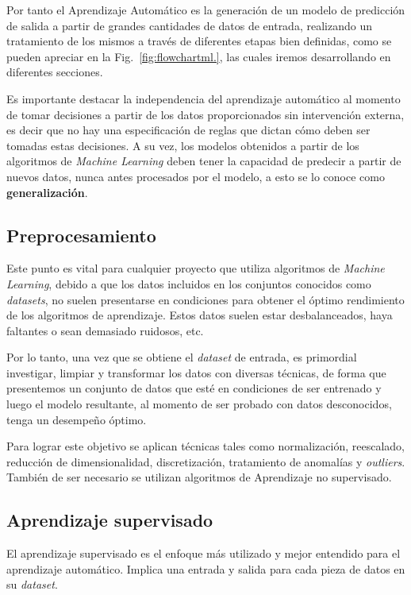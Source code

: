 \documentclass[a4paper,12pt]{article}
\begin{document}
Por tanto el Aprendizaje Automático es la generación de un modelo de predicción de salida a partir de grandes cantidades de datos de entrada, realizando un tratamiento de los mismos a través de diferentes etapas bien definidas, como se pueden apreciar en la Fig.~\ref{fig:flowchartml.}, las cuales iremos desarrollando en diferentes secciones.

Es importante destacar la independencia del aprendizaje automático al momento de tomar decisiones a partir de los datos proporcionados sin intervención externa, es decir que no hay una especificación de reglas que dictan cómo deben ser tomadas estas decisiones. A su vez, los modelos obtenidos a partir de los algoritmos de \textit{Machine Learning} deben tener la capacidad de predecir a partir de nuevos datos, nunca antes procesados por el modelo, a esto se lo conoce como \textbf{generalización}. 

\subsection{Preprocesamiento} \label{preprocessing}
Este punto es vital para cualquier proyecto que utiliza algoritmos de \textit{Machine Learning}, debido a que los datos incluidos en los conjuntos conocidos como \textit{datasets}, no suelen presentarse en condiciones para obtener el óptimo rendimiento de los algoritmos de aprendizaje. Estos datos suelen estar desbalanceados, haya faltantes o sean demasiado ruidosos, etc. 

Por lo tanto, una vez que se obtiene el \textit{dataset} de entrada, es primordial investigar, limpiar y transformar los datos con diversas técnicas, de forma que presentemos un conjunto de datos que esté en condiciones de ser entrenado y luego el modelo resultante, al momento de ser probado con datos desconocidos, tenga un desempeño óptimo.  

Para lograr este objetivo se aplican técnicas tales como normalización, reescalado, reducción de dimensionalidad, discretización, tratamiento de anomalías y \textit{outliers}. También de ser necesario se utilizan algoritmos de Aprendizaje no supervisado.

\subsection{Aprendizaje supervisado} \label{supervised}
El aprendizaje supervisado es el enfoque más utilizado y mejor entendido para el aprendizaje automático. Implica una entrada y salida para cada pieza de datos en su \textit{dataset}. 
\end{document}
